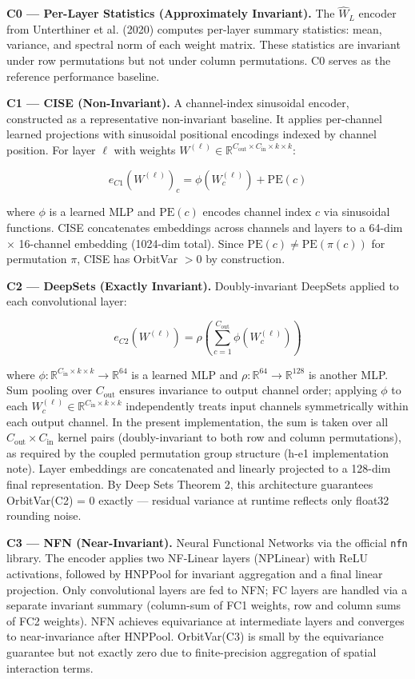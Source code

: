 \textbf{C0 --- Per-Layer Statistics (Approximately Invariant).} The $\hat{W}_L$ encoder from Unterthiner et al. (2020) computes per-layer summary statistics: mean, variance, and spectral norm of each weight matrix. These statistics are invariant under row permutations but not under column permutations. C0 serves as the reference performance baseline.

\textbf{C1 --- CISE (Non-Invariant).} A channel-index sinusoidal encoder, constructed as a representative non-invariant baseline. It applies per-channel learned projections with sinusoidal positional encodings indexed by channel position. For layer $\ell$ with weights $W^{(\ell)} \in \mathbb{R}^{C_\text{out} \times C_\text{in} \times k \times k}$:

$$e_{C1}(W^{(\ell)})_c = \phi(W^{(\ell)}_c) + \text{PE}(c)$$

where $\phi$ is a learned MLP and $\text{PE}(c)$ encodes channel index $c$ via sinusoidal functions. CISE concatenates embeddings across channels and layers to a 64-dim $\times$ 16-channel embedding (1024-dim total). Since $\text{PE}(c) \neq \text{PE}(\pi(c))$ for permutation $\pi$, CISE has OrbitVar $> 0$ by construction.

\textbf{C2 --- DeepSets (Exactly Invariant).} Doubly-invariant DeepSets \citep{Zaheer2017Deep} applied to each convolutional layer:

$$e_{C2}(W^{(\ell)}) = \rho\!\left(\sum_{c=1}^{C_{\text{out}}} \phi(W^{(\ell)}_c)\right)$$

where $\phi: \mathbb{R}^{C_\text{in} \times k \times k} \rightarrow \mathbb{R}^{64}$ is a learned MLP and $\rho: \mathbb{R}^{64} \rightarrow \mathbb{R}^{128}$ is another MLP. Sum pooling over $C_\text{out}$ ensures invariance to output channel order; applying $\phi$ to each $W^{(\ell)}_c \in \mathbb{R}^{C_\text{in} \times k \times k}$ independently treats input channels symmetrically within each output channel. In the present implementation, the sum is taken over all $C_\text{out} \times C_\text{in}$ kernel pairs (doubly-invariant to both row and column permutations), as required by the coupled permutation group structure (h-e1 implementation note). Layer embeddings are concatenated and linearly projected to a 128-dim final representation. By Deep Sets Theorem 2, this architecture guarantees OrbitVar(C2) = 0 exactly --- residual variance at runtime reflects only float32 rounding noise.

\textbf{C3 --- NFN (Near-Invariant).} Neural Functional Networks \citep{Zhou2023Permutation} via the official \texttt{nfn} library. The encoder applies two NF-Linear layers (NPLinear) with ReLU activations, followed by HNPPool for invariant aggregation and a final linear projection. Only convolutional layers are fed to NFN; FC layers are handled via a separate invariant summary (column-sum of FC1 weights, row and column sums of FC2 weights). NFN achieves equivariance at intermediate layers and converges to near-invariance after HNPPool. OrbitVar(C3) is small by the equivariance guarantee but not exactly zero due to finite-precision aggregation of spatial interaction terms.

